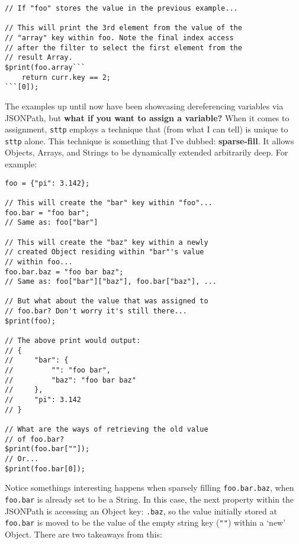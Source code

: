 \begin{verbatim}
// If "foo" stores the value in the previous example...

// This will print the 3rd element from the value of the
// "array" key within foo. Note the final index access 
// after the filter to select the first element from the
// result Array.
$print(foo.array```
    return curr.key == 2;
```[0]);
\end{verbatim}

The examples up until now have been showcasing dereferencing variables via JSONPath, but \textbf{what if you want to assign a variable?} When it comes to assignment, \verb|sttp| employs a technique that (from what I can tell) is unique to \verb|sttp| alone. This technique is something that I've dubbed: \textbf{sparse-fill}. It allows Objects, Arrays, and Strings to be dynamically extended arbitrarily deep. For example:

\begin{verbatim}
foo = {"pi": 3.142};

// This will create the "bar" key within "foo"...
foo.bar = "foo bar";
// Same as: foo["bar"]

// This will create the "baz" key within a newly
// created Object residing within "bar"'s value
// within foo...
foo.bar.baz = "foo bar baz";
// Same as: foo["bar"]["baz"], foo.bar["baz"], ...

// But what about the value that was assigned to
// foo.bar? Don't worry it's still there...
$print(foo);

// The above print would output:
// {
//     "bar": {
//         "": "foo bar",
//         "baz": "foo bar baz"
//     },
//     "pi": 3.142
// }

// What are the ways of retrieving the old value
// of foo.bar?
$print(foo.bar[""]);
// Or...
$print(foo.bar[0]);
\end{verbatim}

Notice somethings interesting happens when sparsely filling \verb|foo.bar.baz|, when \verb|foo.bar| is already set to be a String. In this case, the next property within the JSONPath is accessing an Object key: \verb|.baz|, so the value initially stored at \verb|foo.bar| is moved to be the value of the empty string key (\verb|""|) within a `new' Object. There are two takeaways from this:

